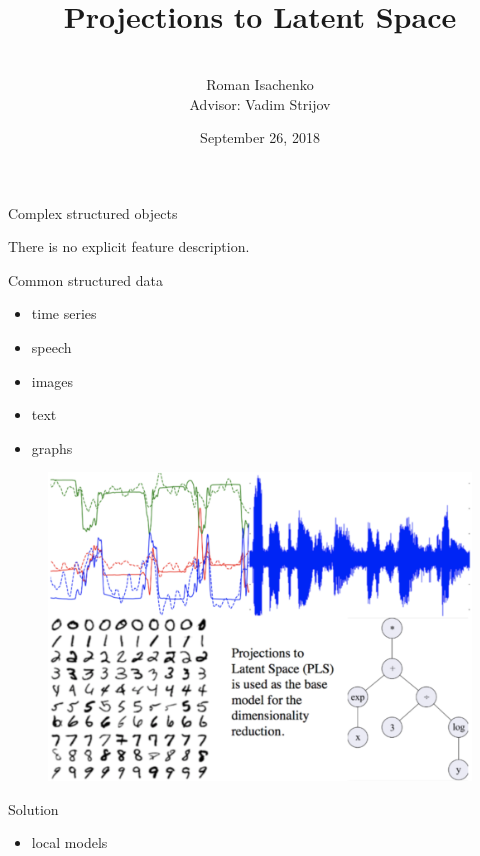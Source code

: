 \documentclass[9pt]{beamer}
\title[\hbox to 56mm{  \hfill\insertframenumber\,/\,\inserttotalframenumber}]
{\\ \vspace{1.5cm} Projections to Latent Space}
\author[Roman Isachenko]{\\ 
	\vspace{.4cm}
	Roman Isachenko \\ \vspace{.2cm}
	Advisor: Vadim Strijov
}
\date{September 26, 2018}
\begin{document}
\begin{frame}
\titlepage
\end{frame}
\begin{frame}{Complex structured objects}

\vspace{0.3cm}
There is no explicit feature description.\\
\vspace{0.3cm}
\begin{minipage}{0.4\textwidth}
\begin{block}{Common structured data}
\begin{itemize}
\item time series
\item speech
\item images
\item text
\item graphs
\end{itemize}
\end{block}
\end{minipage}%
\begin{minipage}{0.6\textwidth}
\begin{figure}
	\includegraphics[width=0.9\linewidth]{figs/collage}
\end{figure}
\end{minipage}
\begin{minipage}{0.5\textwidth}
	\pause
\begin{block}{Solution}
	\begin{itemize}
	\item local models

\end{itemize}
\end{block}
\end{minipage}
\end{frame}
\end{document}
